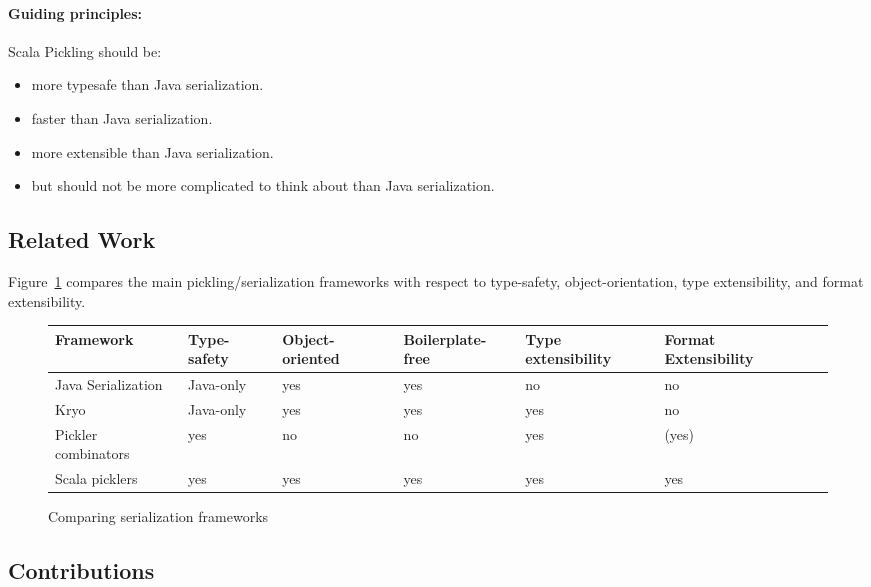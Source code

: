 \documentclass[preprint,10pt]{sigplanconf}
\begin{document}
\paragraph{Guiding principles:}

Scala Pickling should be:
\begin{itemize}
  \item more typesafe than Java serialization.
  \item faster than Java serialization.
  \item more extensible than Java serialization.
  \item but should not be more complicated to think about than Java serialization.
\end{itemize}

\subsection{Related Work}

Figure~\ref{fig:comparison} compares the main pickling/serialization
frameworks with respect to type-safety, object-orientation, type
extensibility, and format extensibility.

\begin{figure}[t]
\begin{tabular}{|l|l|l|l|l|l|l|}
\hline
Framework           & Type-safety  & Object-oriented  & Boilerplate-free  & Type extensibility  & Format Extensibility \\
\hline
Java Serialization  & Java-only    & yes              & yes          & no                  & no \\
Kryo                & Java-only    & yes              & yes          & yes                 & no \\
Pickler combinators & yes          & no               & no           & yes                 & (yes) \\
Scala picklers      & yes          & yes              & yes          & yes                 & yes \\
\hline
\end{tabular}

\caption{Comparing serialization frameworks}\label{fig:comparison}
\end{figure}


\subsection{Contributions}
\end{document}
